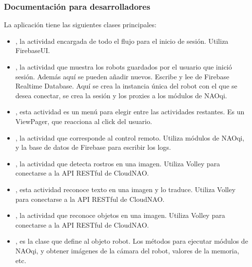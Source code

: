 \subsubsection{Documentación para desarrolladores}
\label{\detokenize{dev_docs:documentacion-para-desarrolladores}}
La aplicación tiene las siguientes clases principales:
\begin{itemize}
\item {} 
, la actividad encargada de todo el flujo para el inicio de sesión. Utiliza FirebaseUI.

\item {} 
, la actividad que muestra los robots guardados por el usuario que inició sesión. Además aquí se pueden añadir nuevos. Escribe y lee de Firebase Realtime Database. Aquí se crea la instancia única del robot con el que se desea conectar, se crea la sesión y los proxies a los módulos de NAOqi.

\item {} 
, esta actividad es un menú para elegir entre las actividades restantes. Es un ViewPager, que reacciona al click del usuario.

\item {} 
, la actividad que corresponde al control remoto. Utiliza módulos de NAOqi, y la base de datos de Firebase para escribir los logs.

\item {} 
, la actividad que detecta rostros en una imagen. Utiliza Volley para conectarse a la API RESTful de CloudNAO.

\item {} 
, esta actividad reconoce texto en una imagen y lo traduce. Utiliza Volley para conectarse a la API RESTful de CloudNAO.

\item {} 
, la actividad que reconoce objetos en una imagen. Utiliza Volley para conectarse a la API RESTful de CloudNAO.

\item {} 
, es la clase que define al objeto robot. Los métodos para ejecutar módulos de NAOqi, y obtener imágenes de la cámara del robot, valores de la memoria, etc.

\end{itemize}



